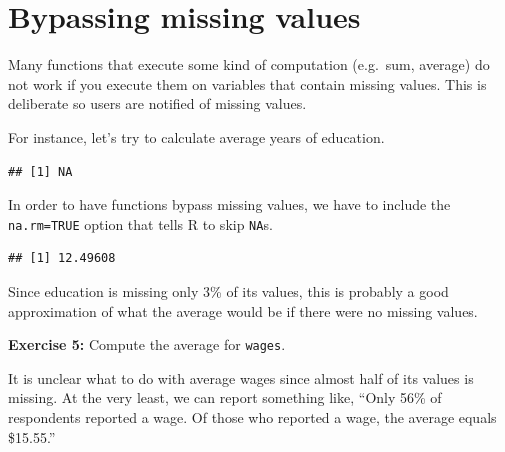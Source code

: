 \documentclass[
]{book}
\newenvironment{Shaded}{\begin{snugshade}}{\end{snugshade}}
\newcommand{\DataTypeTok}[1]{\textcolor[rgb]{0.13,0.29,0.53}{#1}}
\newcommand{\KeywordTok}[1]{\textcolor[rgb]{0.13,0.29,0.53}{\textbf{#1}}}
\newcommand{\NormalTok}[1]{#1}
\newcommand{\OperatorTok}[1]{\textcolor[rgb]{0.81,0.36,0.00}{\textbf{#1}}}
\newcommand{\OtherTok}[1]{\textcolor[rgb]{0.56,0.35,0.01}{#1}}
\newenvironment{learncheck}%
{%
  \par\vspace{\baselineskip}\noindent 
  \color{Exercise}\begin{itshape}%
  \par\vspace{\baselineskip}\noindent\ignorespaces 
}%
{%
  \end{itshape}\ignorespacesafterend 
}
\begin{document}
\hypertarget{bypassing-missing-values}{%
\section{Bypassing missing values}\label{bypassing-missing-values}}

Many functions that execute some kind of computation (e.g.~sum, average) do not work if you execute them on variables that contain missing values. This is deliberate so users are notified of missing values.

For instance, let's try to calculate average years of education.

\begin{Shaded}
\end{Shaded}

\begin{verbatim}
## [1] NA
\end{verbatim}

In order to have functions bypass missing values, we have to include the \texttt{na.rm=TRUE} option that tells R to skip \texttt{NA}s.

\begin{Shaded}
\end{Shaded}

\begin{verbatim}
## [1] 12.49608
\end{verbatim}

Since education is missing only 3\% of its values, this is probably a good approximation of what the average would be if there were no missing values.

\begin{learncheck}
\textbf{Exercise 5:} Compute the average for \texttt{wages}.
\end{learncheck}

It is unclear what to do with average wages since almost half of its values is missing. At the very least, we can report something like, ``Only 56\% of respondents reported a wage. Of those who reported a wage, the average equals \$15.55.''
\end{document}
